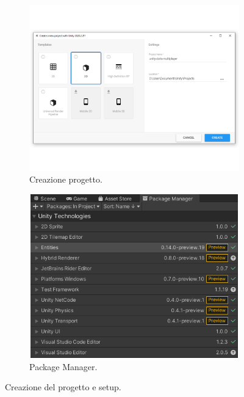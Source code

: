 \begin{figure}[!ht]
    \begin{subfigure}{.49\textwidth}
      \centering
      \includegraphics[width=.95\linewidth]{gfx/imgs/chapter4/CreazioneProgetto.png}
      \caption{Creazione progetto.}
      \label{fig:prototipo-creazione-progetto}
    \end{subfigure}
    \begin{subfigure}{.49\textwidth}
      \centering
      \includegraphics[width=.95\linewidth]{gfx/imgs/chapter4/PackagesPrototipo(actual)2.png}
      \caption{Package Manager.}
      \label{fig:prototipo-packages}
    \end{subfigure}
    \caption{Creazione del progetto e setup.}
    \label{fig:prototipo-setup-progetto}
\end{figure}

